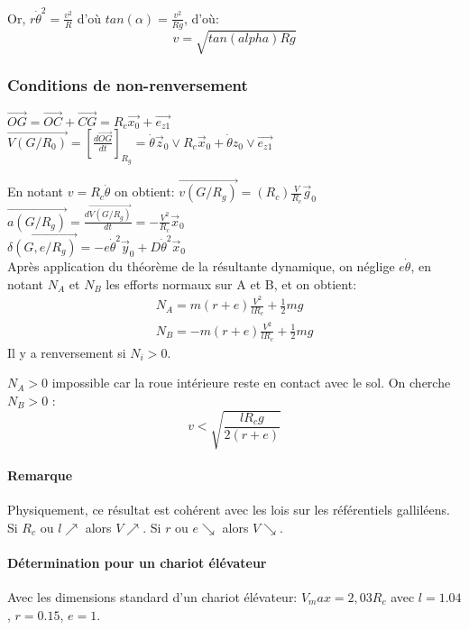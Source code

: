 Or, $r\dot\theta^2 = \frac{v^2}{R}$ d'où $tan(\alpha) = \frac{v^2}{Rg}$, d'où:
\begin{equation}
	\label{expr:der:vitesseMaxVirage}
	v = \sqrt{tan(alpha)Rg}
\end{equation}
\subsubsection{Conditions de non-renversement}

$\vec{OG} = \vec{OC} + \vec{CG} = R_c \vec{x_0} + \vec{e_{z1}}$ \\
$\vec{V\left(G/R_0\right)} = \left[\frac{d\vec{OG}}{dt}\right]_{R_g} = \dot\theta \vec z_0 \lor R_c \vec x_0 + \dot \theta z_0 \lor \vec{e_{z1}}$

En notant $v=R_c \dot\theta$ on obtient:
$\vec{v\left(G/R_g\right)} = \left(R_c\right)\frac{V}{R_c}\vec g_0$\\
$\vec{a(G/R_g)} = \frac{d\vec{V(G/R_g)}}{dt} = -\frac{V^2}{R_c} \vec x_0$\\
$\vec{\delta(G, e/R_g)} = -e\dot\theta^2 \vec y_0 + D\dot\theta^2 \vec x_0$\\

Après application du théorème de la résultante dynamique, on néglige $e\dot\theta$, en notant $N_A$ et $N_B$ les efforts normaux sur A et B, et on obtient:
\[ \begin{array}{c}
	N_A = m(r+e) \frac{V^2}{lR_c} + \frac{1}{2}mg  \\
	N_B = -m(r+e) \frac{V^2}{lR_c} + \frac{1}{2}mg
\end{array}
\]
Il y a renversement si $N_i > 0$.


$N_A>0$ impossible car la roue intérieure reste en contact avec le sol. On cherche $N_B>0$ :\\
\begin{equation}
	\label{expr:vitesseMaxRenversement}
	v<\sqrt{\frac{lR_c g}{2(r+e)}}
\end{equation}
\paragraph{Remarque} Physiquement, ce résultat est cohérent avec les lois sur les référentiels galliléens. Si $R_c$ ou $l\nearrow$ alors $V\nearrow$. Si $r$ ou $e\searrow$ alors $V\searrow$.

\paragraph{Détermination pour un chariot élévateur}Avec les dimensions standard d'un chariot élévateur: $V_max = 2,03 R_c$ avec $l=1.04$, $r=0.15$, $e=1$.
